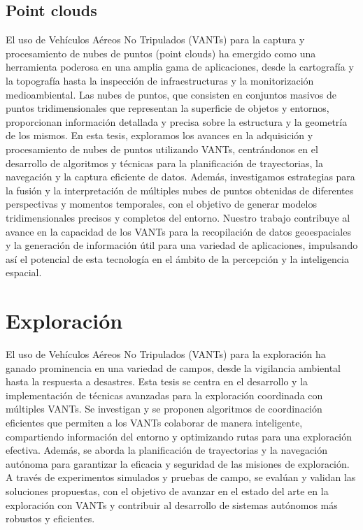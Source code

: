 \subsection{Point clouds}

El uso de Vehículos Aéreos No Tripulados (VANTs) para la captura y procesamiento de nubes de puntos (point clouds) ha emergido como una herramienta poderosa en una amplia gama de aplicaciones, desde la cartografía y la topografía hasta la inspección de infraestructuras y la monitorización medioambiental. Las nubes de puntos, que consisten en conjuntos masivos de puntos tridimensionales que representan la superficie de objetos y entornos, proporcionan información detallada y precisa sobre la estructura y la geometría de los mismos. En esta tesis, exploramos los avances en la adquisición y procesamiento de nubes de puntos utilizando VANTs, centrándonos en el desarrollo de algoritmos y técnicas para la planificación de trayectorias, la navegación y la captura eficiente de datos. Además, investigamos estrategias para la fusión y la interpretación de múltiples nubes de puntos obtenidas de diferentes perspectivas y momentos temporales, con el objetivo de generar modelos tridimensionales precisos y completos del entorno. Nuestro trabajo contribuye al avance en la capacidad de los VANTs para la recopilación de datos geoespaciales y la generación de información útil para una variedad de aplicaciones, impulsando así el potencial de esta tecnología en el ámbito de la percepción y la inteligencia espacial.

\section{Exploración}

El uso de Vehículos Aéreos No Tripulados (VANTs) para la exploración ha ganado prominencia en una variedad de campos, desde la vigilancia ambiental hasta la respuesta a desastres. Esta tesis se centra en el desarrollo y la implementación de técnicas avanzadas para la exploración coordinada con múltiples VANTs. Se investigan y se proponen algoritmos de coordinación eficientes que permiten a los VANTs colaborar de manera inteligente, compartiendo información del entorno y optimizando rutas para una exploración efectiva. Además, se aborda la planificación de trayectorias y la navegación autónoma para garantizar la eficacia y seguridad de las misiones de exploración. A través de experimentos simulados y pruebas de campo, se evalúan y validan las soluciones propuestas, con el objetivo de avanzar en el estado del arte en la exploración con VANTs y contribuir al desarrollo de sistemas autónomos más robustos y eficientes.

